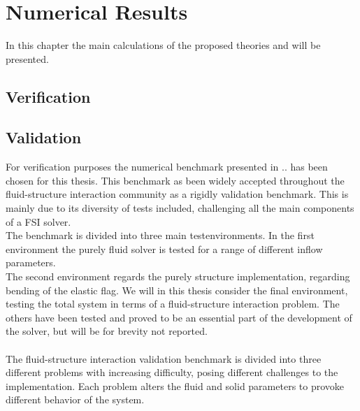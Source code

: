 \chapter{Numerical Results}

In this chapter the main calculations of the proposed theories and will be presented. 

\section{Verification}

\section{Validation}
For verification purposes the numerical benchmark presented in .. has been chosen for this thesis. This benchmark as been widely accepted throughout the fluid-structure interaction community as a rigidly validation benchmark. This is mainly due to its diversity of tests included, challenging all the main components of a FSI solver. \\
The benchmark is divided into three main testenvironments.
In the first environment the purely fluid solver is tested for a range of different inflow parameters. \\
The second environment regards the purely structure implementation, regarding bending of the elastic flag. We will in this thesis consider the final environment, testing the total system in terms of a fluid-structure interaction problem. The others have been tested and proved to be an essential part of the development of the solver, but will be for brevity not reported. \\ \\

The fluid-structure interaction validation benchmark is divided into three different problems with increasing difficulty, posing different challenges to the implementation. 
Each problem alters the fluid and solid parameters to provoke different behavior of the system.

